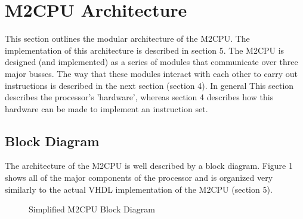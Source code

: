 \documentclass[a4paper,12pt]{article}
\newcommand{\mt}{M2CPU}
\begin{document}
\newpage
\section{\mt{} Architecture}
This section outlines the modular architecture of the \mt{}. The implementation
of this architecture is described in section 5. The \mt{} is designed (and 
implemented) as a series of modules that communicate over three major busses. 
The way that these modules interact with each other to carry out instructions is
described in the next section (section 4). In general This section describes the 
processor's 'hardware', whereas section 4 describes how this hardware can be 
made to implement an instruction set.
\par

\subsection{Block Diagram}
The architecture of the \mt{} is well described by a block diagram. Figure 1
shows all of the major components of the processor and is organized very 
similarly to the actual VHDL implementation of the \mt{} (section 5).
\par

\newpage
\thispagestyle{empty}
\begin{landscape}
	\begin{figure}
	\caption{Simplified \mt{} Block Diagram}
	\end{figure}
\end{landscape}
\end{document}
